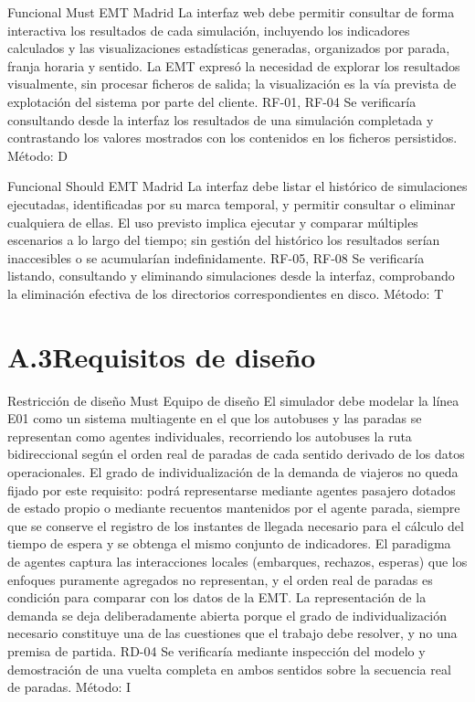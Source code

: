 {Funcional}
{Must}
{EMT Madrid}
{La interfaz web debe permitir consultar de forma interactiva los resultados de cada simulación, incluyendo los
indicadores calculados y las visualizaciones estadísticas generadas, organizados por parada, franja horaria y sentido.}
{La EMT expresó la necesidad de explorar los resultados visualmente, sin procesar ficheros de salida; la visualización
es la vía prevista de explotación del sistema por parte del cliente.}
{RF-01, RF-04}
{Se verificaría consultando desde la interfaz los resultados de una simulación completada y contrastando los valores
mostrados con los contenidos en los ficheros persistidos. Método: D}

{Funcional}
{Should}
{EMT Madrid}
{La interfaz debe listar el histórico de simulaciones ejecutadas, identificadas por su marca temporal, y permitir
consultar o eliminar cualquiera de ellas.}
{El uso previsto implica ejecutar y comparar múltiples escenarios a lo largo del tiempo; sin gestión del histórico
los resultados serían inaccesibles o se acumularían indefinidamente.}
{RF-05, RF-08}
{Se verificaría listando, consultando y eliminando simulaciones desde la interfaz, comprobando la eliminación
efectiva de los directorios correspondientes en disco. Método: T}

\section*{A.3\quad Requisitos de diseño}

{Restricción de diseño}
{Must}
{Equipo de diseño}
{El simulador debe modelar la línea E01 como un sistema multiagente en el que los autobuses y las paradas se
representan como agentes individuales, recorriendo los autobuses la ruta bidireccional según el orden real de
paradas de cada sentido derivado de los datos operacionales. El grado de individualización de la demanda de
viajeros no queda fijado por este requisito: podrá representarse mediante agentes pasajero dotados de estado
propio o mediante recuentos mantenidos por el agente parada, siempre que se conserve el registro de los instantes
de llegada necesario para el cálculo del tiempo de espera y se obtenga el mismo conjunto de indicadores.}
{El paradigma de agentes captura las interacciones locales (embarques, rechazos, esperas) que los enfoques
puramente agregados no representan, y el orden real de paradas es condición para comparar con los datos de la EMT.
La representación de la demanda se deja deliberadamente abierta porque el grado de individualización necesario
constituye una de las cuestiones que el trabajo debe resolver, y no una premisa de partida.}
{RD-04}
{Se verificaría mediante inspección del modelo y demostración de una vuelta completa en ambos sentidos sobre la
secuencia real de paradas. Método: I}

